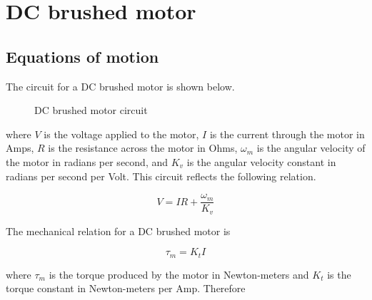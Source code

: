 \section{DC brushed motor}

\subsection{Equations of motion}

The circuit for a DC brushed motor is shown below.

\begin{figure}[H]
  \centering


  \caption{DC brushed motor circuit}
  \label{fig:dc_motor_circuit}
\end{figure}

where $V$ is the voltage applied to the motor, $I$ is the current through the
motor in Amps, $R$ is the resistance across the motor in Ohms, $\omega_m$ is the
angular velocity of the motor in radians per second, and $K_v$ is the angular
velocity constant in radians per second per Volt. This circuit reflects the
following relation.

\begin{equation}
  V = IR + \frac{\omega_m}{K_v} \label{eq:motor_V}
\end{equation}

The mechanical relation for a DC brushed motor is

\begin{equation}
  \tau_m = K_t I \label{eq:motor_tau_m}
\end{equation}

where $\tau_m$ is the torque produced by the motor in Newton-meters and $K_t$ is
the torque constant in Newton-meters per Amp. Therefore

